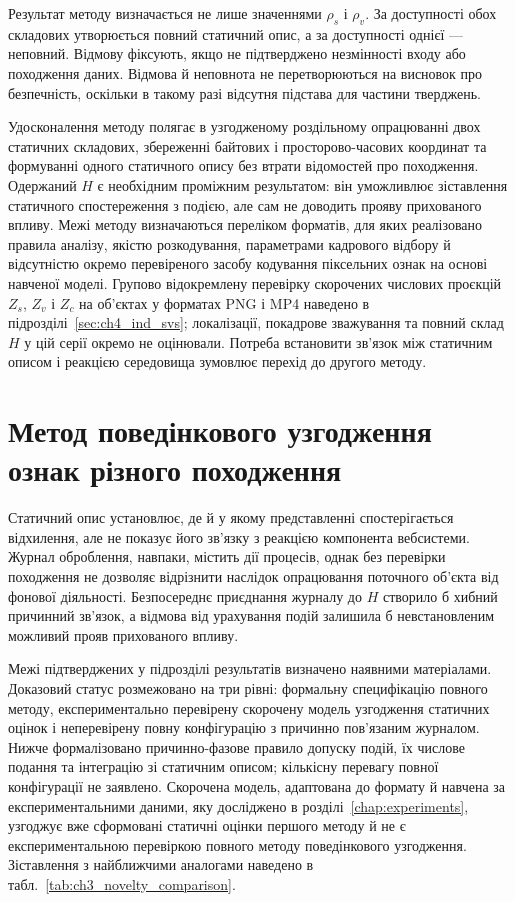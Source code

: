 Результат методу визначається не лише значеннями $\rho_s$ і $\rho_v$. За доступності обох складових утворюється повний статичний опис, а за доступності однієї --- неповний. Відмову фіксують, якщо не підтверджено незмінності входу або походження даних. Відмова й неповнота не перетворюються на висновок про безпечність, оскільки в такому разі відсутня підстава для частини тверджень.

Удосконалення методу полягає в узгодженому роздільному опрацюванні двох статичних складових, збереженні байтових і просторово-часових координат та формуванні одного статичного опису без втрати відомостей про походження. Одержаний $H$ є необхідним проміжним результатом: він уможливлює зіставлення статичного спостереження з подією, але сам не доводить прояву прихованого впливу. Межі методу визначаються переліком форматів, для яких реалізовано правила аналізу, якістю розкодування, параметрами кадрового відбору й відсутністю окремо перевіреного засобу кодування піксельних ознак на основі навченої моделі. Групово відокремлену перевірку скорочених числових проєкцій $Z_s$, $Z_v$ і $Z_c$ на об’єктах у форматах PNG і MP4 наведено в підрозділі~\ref{sec:ch4_ind_svs}; локалізації, покадрове зважування та повний склад $H$ у цій серії окремо не оцінювали. Потреба встановити зв’язок між статичним описом і реакцією середовища зумовлює перехід до другого методу.

\section{Метод поведінкового узгодження ознак різного походження}
\label{sec:behavior_alignment}

Статичний опис установлює, де й у якому представленні спостерігається відхилення, але не показує його зв’язку з реакцією компонента вебсистеми. Журнал оброблення, навпаки, містить дії процесів, однак без перевірки походження не дозволяє відрізнити наслідок опрацювання поточного об’єкта від фонової діяльності. Безпосереднє приєднання журналу до $H$ створило б хибний причинний зв’язок, а відмова від урахування подій залишила б невстановленим можливий прояв прихованого впливу.

Межі підтверджених у підрозділі результатів визначено наявними матеріалами. Доказовий статус розмежовано на три рівні: формальну специфікацію повного методу, експериментально перевірену скорочену модель узгодження статичних оцінок і неперевірену повну конфігурацію з причинно пов’язаним журналом. Нижче формалізовано причинно-фазове правило допуску подій, їх числове подання та інтеграцію зі статичним описом; кількісну перевагу повної конфігурації не заявлено. Скорочена модель, адаптована до формату й навчена за експериментальними даними, яку досліджено в розділі~\ref{chap:experiments}, узгоджує вже сформовані статичні оцінки першого методу й не є експериментальною перевіркою повного методу поведінкового узгодження. Зіставлення з найближчими аналогами наведено в табл.~\ref{tab:ch3_novelty_comparison}.

